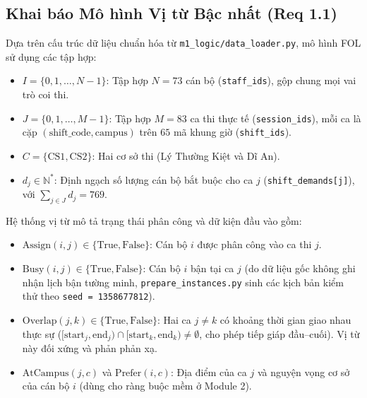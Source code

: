 \subsection{Khai báo Mô hình Vị từ Bậc nhất (Req 1.1)}
\label{sec:m1_fol}

Dựa trên cấu trúc dữ liệu chuẩn hóa từ \texttt{m1\_logic/data\_loader.py}, mô hình FOL sử dụng các tập hợp:
\begin{itemize}
    \item $I = \{0, 1, \dots, N-1\}$: Tập hợp $N = 73$ cán bộ (\texttt{staff\_ids}), gộp chung mọi vai trò coi thi.
    \item $J = \{0, 1, \dots, M-1\}$: Tập hợp $M = 83$ ca thi thực tế (\texttt{session\_ids}), mỗi ca là cặp $(\text{shift\_code}, \text{campus})$ trên $65$ mã khung giờ (\texttt{shift\_ids}).
    \item $C = \{\text{CS1}, \text{CS2}\}$: Hai cơ sở thi (Lý Thường Kiệt và Dĩ An).
    \item $d_j \in \mathbb{N}^*$: Định ngạch số lượng cán bộ bắt buộc cho ca $j$ (\texttt{shift\_demands[j]}), với $\sum_{j \in J} d_j = 769$.
\end{itemize}

Hệ thống vị từ mô tả trạng thái phân công và dữ kiện đầu vào gồm:
\begin{itemize}
    \item $\text{Assign}(i, j) \in \{\text{True}, \text{False}\}$: Cán bộ $i$ được phân công vào ca thi $j$.
    \item $\text{Busy}(i, j) \in \{\text{True}, \text{False}\}$: Cán bộ $i$ bận tại ca $j$ (do dữ liệu gốc không ghi nhận lịch bận tường minh, \texttt{prepare\_instances.py} sinh các kịch bản kiểm thử theo \texttt{seed = 1358677812}).
    \item $\text{Overlap}(j, k) \in \{\text{True}, \text{False}\}$: Hai ca $j \neq k$ có khoảng thời gian giao nhau thực sự ($[\text{start}_j, \text{end}_j) \cap [\text{start}_k, \text{end}_k) \neq \emptyset$, cho phép tiếp giáp đầu--cuối). Vị từ này đối xứng và phản phản xạ.
    \item $\text{AtCampus}(j, c)$ và $\text{Prefer}(i, c)$: Địa điểm của ca $j$ và nguyện vọng cơ sở của cán bộ $i$ (dùng cho ràng buộc mềm ở Module 2).
\end{itemize}


